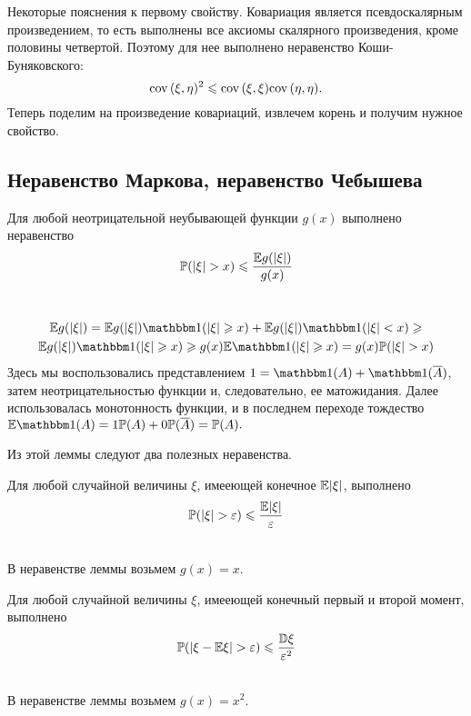 \documentclass[../TV&MS.tex]{subfiles}
\begin{document}
Некоторые пояснения к первому свойству.
Ковариация является псевдоскалярным произведением, то есть 
выполнены все аксиомы скалярного произведения, кроме половины четвертой. 
Поэтому для нее выполнено неравенство Коши-Буняковского:
\begin{equation}
    {\rm cov \,}(\xi, \eta)^2 \leqslant {\rm cov \,}(\xi, \xi){\rm cov \,}(\eta, \eta)
.\end{equation} 
Теперь поделим на произведение ковариаций, извлечем корень и получим нужное свойство.

\subsection{Неравенство Маркова, неравенство Чебышева}
\begin{Lem}
Для любой неотрицательной неубывающей функции $g(x)$ выполнено неравенство 
$$\mathbb{P}(|\xi| > x) \leqslant \frac{\mathbb{E} g(|\xi|)}{g(x)}$$
\end{Lem}
\begin{Proof} \\
\begin{multline*}
    \Expec g(|\xi|) = \Expec g(|\xi|) \Ind(|\xi| \geqslant x) +
    \Expec g(|\xi|) \Ind(|\xi| < x) \geqslant \\
    \Expec g(|\xi|) \Ind(|\xi| \geqslant x) \geqslant 
    g(x)\Expec\Ind(|\xi| \geqslant x) = g(x)\Pro(|\xi| > x)
\end{multline*}
Здесь мы воспользовались представлением $1 = \Ind(A) + \Ind(\overline{A})$, 
затем неотрицательностью функции и, следовательно, ее матожидания. 
Далее использовалась монотонность функции, и в последнем переходе тождество 
$\Expec \Ind(A) = 1 \Pro(A) + 0 \Pro(\overline{A}) = \Pro(A).$
\end{Proof}

Из этой леммы следуют два полезных неравенства.

\begin{Th} 
Для любой случайной величины $\xi$, имееющей конечное $\mathbb{E}|\xi|$, выполнено
$$\mathbb{P}(|\xi| > \varepsilon) \leqslant \frac{\mathbb{E}|\xi|}{\varepsilon}$$
\end{Th}
\begin{Proof}\\
В неравенстве леммы возьмем $g(x) = x$.
\end{Proof}

\begin{Th} 
Для любой случайной величины $\xi$, имееющей конечный первый и второй момент, выполнено
$$\mathbb{P}(|\xi - \mathbb{E}\xi| > \varepsilon) \leqslant \frac{\mathbb{D}\xi}{\varepsilon^2}$$
\end{Th}
\begin{Proof}\\
В неравенстве леммы возьмем $g(x) = x^2$.
\end{Proof}


\newpage
\end{document}
